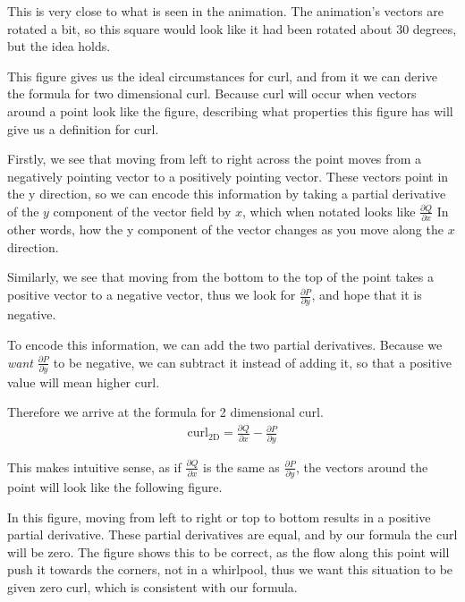 \documentclass{article}
\begin{document}
    This is very close to what is seen in the animation.
    The animation's vectors are rotated a bit, so this square would look like it had been rotated about 30 degrees, but the idea holds.

    This figure gives us the ideal circumstances for curl, and from it we can derive the formula for two dimensional curl.
    Because curl will occur when vectors around a point look like the figure, describing what properties this figure has will give us a definition for curl.

    Firstly, we see that moving from left to right across the point moves from a negatively pointing vector to a positively pointing vector.
    These vectors point in the y direction, so we can encode this information by taking a partial derivative of the $y$ component of the vector field by $x$, which when notated looks like
    $\frac{\partial Q}{\partial x}$
    In other words, how the y component of the vector changes as you move along the $x$ direction.

    Similarly, we see that moving from the bottom to the top of the point takes a positive vector to a negative vector, thus we look for 
    $\frac{\partial P}{ \partial y}$, and hope that it is negative.
    
    To encode this information, we can add the two partial derivatives.
    Because we \emph{want} $\frac{\partial P}{ \partial y}$ to be negative, we can subtract it instead of adding it, so that a positive value will mean higher curl.

    Therefore we arrive at the formula for 2 dimensional curl.
    \begin{gather*}
        \text{curl}_\text{2D} =  \frac{\partial Q}{\partial x} - \frac{\partial P}{\partial y}
    \end{gather*}

    This makes intuitive sense, as if $\frac{\partial Q}{\partial x}$ is the same as $\frac{\partial P}{\partial y}$, the vectors around the point will look like the following figure.

    \begin{figure}[!h]
        \centering
    \end{figure}
    In this figure, moving from left to right or top to bottom results in a positive partial derivative.
    These partial derivatives are equal, and by our formula the curl will be zero.
    The figure shows this to be correct, as the flow along this point will push it towards the corners, not in a whirlpool, thus we want this situation to be given zero curl, which is consistent with our formula.
\end{document}
